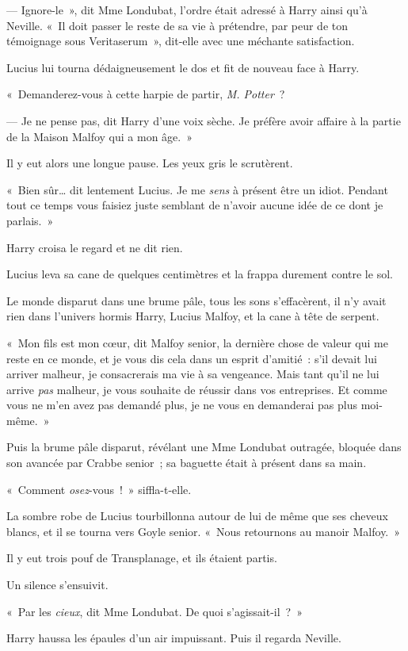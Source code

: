 --- Ignore-le~», dit Mme Londubat, l'ordre était adressé à Harry ainsi qu'à Neville.
«~Il doit passer le reste de sa vie à prétendre, par peur de ton témoignage sous Veritaserum~», dit-elle avec une méchante satisfaction.

Lucius lui tourna dédaigneusement le dos et fit de nouveau face à Harry.

«~Demanderez-vous à cette harpie de partir, \emph{M. Potter}~?

--- Je ne pense pas, dit Harry d'une voix sèche.
Je préfère avoir affaire à la partie de la Maison Malfoy qui a mon âge.~»

Il y eut alors une longue pause.
Les yeux gris le scrutèrent.

«~Bien sûr… dit lentement Lucius.
Je me \emph{sens} à présent être un idiot.
Pendant tout ce temps vous faisiez juste semblant de n'avoir aucune idée de ce dont je parlais.~»

Harry croisa le regard et ne dit rien.

Lucius leva sa cane de quelques centimètres et la frappa durement contre le sol.

Le monde disparut dans une brume pâle, tous les sons s'effacèrent, il n'y avait rien dans l'univers hormis Harry, Lucius Malfoy, et la cane à tête de serpent.

«~Mon fils est mon cœur, dit Malfoy senior, la dernière chose de valeur qui me reste en ce monde, et je vous dis cela dans un esprit d'amitié~: s'il devait lui arriver malheur, je consacrerais ma vie à sa vengeance.
Mais tant qu'il ne lui arrive \emph{pas} malheur, je vous souhaite de réussir dans vos entreprises.
Et comme vous ne m'en avez pas demandé plus, je ne vous en demanderai pas plus moi-même.~»

Puis la brume pâle disparut, révélant une Mme Londubat outragée, bloquée dans son avancée par Crabbe senior~; sa baguette était à présent dans sa main.

«~Comment \emph{osez}-vous~!~»
siffla-t-elle.

La sombre robe de Lucius tourbillonna autour de lui de même que ses cheveux blancs, et il se tourna vers Goyle senior.
«~Nous retournons au manoir Malfoy.~»

Il y eut trois pouf de Transplanage, et ils étaient partis.

Un silence s'ensuivit.

«~Par les \emph{cieux}, dit Mme Londubat.
De quoi s'agissait-il~?~»

Harry haussa les épaules d'un air impuissant.
Puis il regarda Neville.

